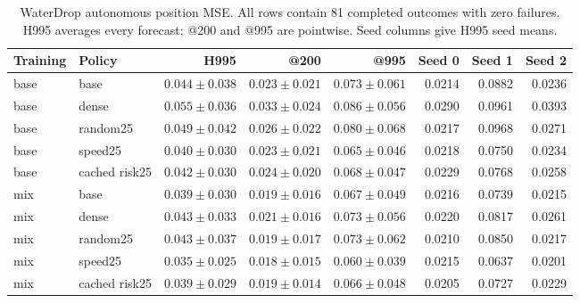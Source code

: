 \begin{table}[p]\centering\scriptsize
\caption{WaterDrop autonomous position MSE. All rows contain 81 completed outcomes with zero failures. H995 averages every forecast; @200 and @995 are pointwise. Seed columns give H995 seed means.}
\label{tab:waterdrop110k-rollout}
\begin{tabular}{llrrrrrr}\toprule
Training & Policy & H995 & @200 & @995 & Seed 0 & Seed 1 & Seed 2\\\midrule
base & base & $0.044\pm0.038$ & $0.023\pm0.021$ & $0.073\pm0.061$ & 0.0214 & 0.0882 & 0.0236\\
base & dense & $0.055\pm0.036$ & $0.033\pm0.024$ & $0.086\pm0.056$ & 0.0290 & 0.0961 & 0.0393\\
base & random25 & $0.049\pm0.042$ & $0.026\pm0.022$ & $0.080\pm0.068$ & 0.0217 & 0.0968 & 0.0271\\
base & speed25 & $0.040\pm0.030$ & $0.023\pm0.021$ & $0.065\pm0.046$ & 0.0218 & 0.0750 & 0.0234\\
base & cached risk25 & $0.042\pm0.030$ & $0.024\pm0.020$ & $0.068\pm0.047$ & 0.0229 & 0.0768 & 0.0258\\
mix & base & $0.039\pm0.030$ & $0.019\pm0.016$ & $0.067\pm0.049$ & 0.0216 & 0.0739 & 0.0215\\
mix & dense & $0.043\pm0.033$ & $0.021\pm0.016$ & $0.073\pm0.056$ & 0.0220 & 0.0817 & 0.0261\\
mix & random25 & $0.043\pm0.037$ & $0.019\pm0.017$ & $0.073\pm0.062$ & 0.0210 & 0.0850 & 0.0217\\
mix & speed25 & $0.035\pm0.025$ & $0.018\pm0.015$ & $0.060\pm0.039$ & 0.0215 & 0.0637 & 0.0201\\
mix & cached risk25 & $0.039\pm0.029$ & $0.019\pm0.014$ & $0.066\pm0.048$ & 0.0205 & 0.0727 & 0.0229\\
\bottomrule\end{tabular}\end{table}

